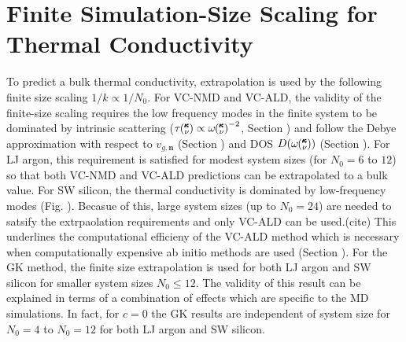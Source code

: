 \documentclass[aps,prb,onecolumn,preprint,superscriptaddress,amsmath,amssymb,floatfix]{revtex4}
\newcommand{\kv}{\mspace{-4.0mu}\left(\mspace{-8.0mu}
\begin{smallmatrix}&\pmb{\kappa} \\&\nu\end{smallmatrix}
\mspace{-3.0mu}\right)}
\begin{document}
\section{\label{A:Finite Simulation-Size}
Finite Simulation-Size Scaling for Thermal 
Conductivity}
To predict a bulk thermal conductivity, extrapolation is used by the 
following finite size scaling $ 1 / k \propto 1/N_0$. For VC-NMD and 
VC-ALD, the validity of the finite-size scaling 
requires the low frequency modes in the finite system to be dominated by 
intrinsic scattering ($\tau\kv \propto \omega\kv^{-2}$, Section ) and  
follow the Debye approximation 
with respect to $v_{g,\mathbf{n}}$ (Section ) and DOS $D(\omega\kv)$ 
(Section ).\cite{shiomi_thermal_2011,esfarjani_heat_2011} For LJ 
argon, this requirement is satisfied for modest system sizes 
(for $N_0 = 6$ to $12$) so that both VC-NMD and VC-ALD predictions 
can be extrapolated to a bulk value. 
For SW silicon, the thermal conductivity is dominated by low-frequency 
modes (Fig. ). Becasue of this, large system sizes 
(up to $N_0 = 24$) are needed to satsify the 
extrpaolation requirements and only VC-ALD can be used.(cite) This 
underlines the computational efficieny of the VC-ALD method which is 
necessary when computationally expensive 
ab initio methods are used (Section ).
\cite{garg_role_2011,tian_phonon_2012,
lindsay_thermal_2012,esfarjani_heat_2011} 
For the GK method, the finite size extrapolation is used for 
both LJ argon and SW silicon for smaller system sizes $N_0 \le 12$. 
The validity of this result can be explained in terms of a 
combination of effects which are specific to the MD simulations.
\cite{esfarjani_heat_2011} In fact, for $c=0$ the GK results are independent 
of system size for $N_0 = 4$ to $N_0 = 12$ for both LJ argon and SW silicon.

\clearpage

%

\end{document}
